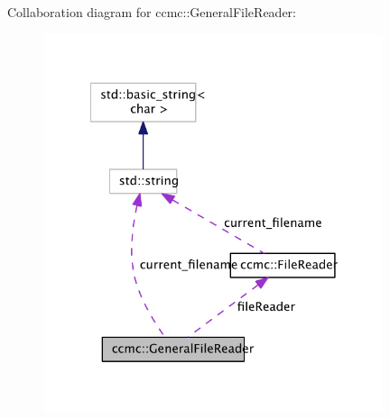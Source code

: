 Collaboration diagram for ccmc\-:\-:General\-File\-Reader\-:\nopagebreak
\begin{figure}[H]
\begin{center}
\leavevmode
\includegraphics[width=282pt]{classccmc_1_1_general_file_reader__coll__graph}
\end{center}
\end{figure}
